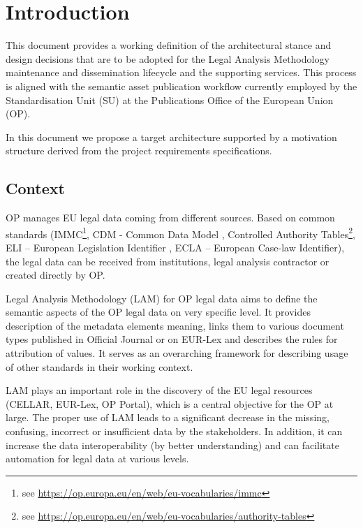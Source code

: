 \chapter{Introduction}
\label{sec:introduction}
	
	This document provides a working definition of the architectural stance and design decisions that are to be adopted for the Legal Analysis Methodology maintenance and dissemination lifecycle and the supporting services. This process is aligned with the semantic asset publication workflow currently employed by the Standardisation Unit (SU) at the Publications Office of the European Union (OP).
	
	In this document we propose a target architecture supported by a motivation structure derived from the project requirements specifications.
	
	\section{Context}
	\label{sec:context}
	
	OP manages EU legal data coming from different sources. Based on common standards (IMMC\footnote{see \url{https://op.europa.eu/en/web/eu-vocabularies/immc}}, CDM - Common Data Model \citep{cdm-francesconi2015ontology,cdm-francesconi2015semantic}, Controlled Authority Tables\footnote{see \url{https://op.europa.eu/en/web/eu-vocabularies/authority-tables}}, ELI – European Legislation Identifier \citep{eli-conclussions-2012/c325/02,eli-conclussions-2017/c441/05}, ECLA – European Case-law Identifier\citep{ecli-van2011european,ecli-van2017line}), the legal data can be received from institutions, legal analysis contractor or created directly by OP.
	
	Legal Analysis Methodology (LAM) for OP legal data aims to define the semantic aspects of the OP legal data on very specific level. It provides description of the metadata elements meaning, links them to various document types published in Official Journal or on EUR-Lex and describes the rules for attribution of values. It serves as an overarching framework for describing usage of other standards in their working context.
	
	LAM plays an important role in the discovery of the EU legal resources (CELLAR, EUR-Lex, OP Portal), which is a central objective for the OP at large. The proper use of LAM leads to a significant decrease in the missing, confusing, incorrect or insufficient data by the stakeholders. In addition, it can increase the data interoperability (by better understanding) and can facilitate automation for legal data at various levels.
	
